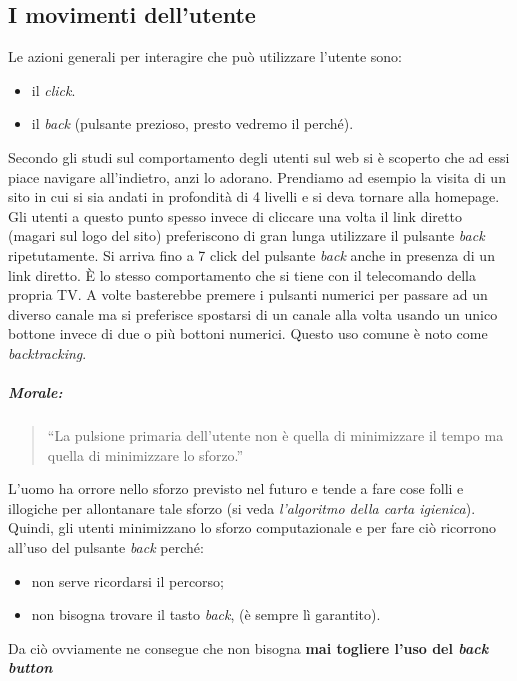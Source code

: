 		\subsection{I movimenti dell'utente}
			Le azioni generali per interagire che può utilizzare l'utente sono:
			\begin{itemize}
				\item il \emph{click}.
				\item il \emph{back} (pulsante prezioso, presto vedremo il perché).
			\end{itemize}
			Secondo gli studi sul comportamento degli utenti sul web si è scoperto che ad essi piace navigare all'indietro, anzi lo adorano. Prendiamo ad esempio la visita di un sito in cui si sia andati in profondità di 4 livelli e si deva tornare alla homepage. Gli utenti a questo punto spesso invece di cliccare una volta  il link diretto (magari sul logo del sito) preferiscono di gran lunga utilizzare il pulsante \emph{back} ripetutamente.
			Si arriva fino a 7 click del pulsante \emph{back} anche in presenza di un link diretto. È lo stesso comportamento che si tiene con il telecomando della propria TV. A volte basterebbe premere i pulsanti numerici per passare ad un diverso canale ma si preferisce spostarsi di un canale alla volta usando un unico bottone invece di due o più bottoni numerici. Questo uso comune è noto come \emph{backtracking}.
			\subparagraph*{Morale:}
			\begin{quote}
				``La pulsione primaria dell'utente non è quella di minimizzare il tempo ma quella di minimizzare lo sforzo.''
			\end{quote}
			L'uomo ha orrore nello sforzo previsto nel futuro e tende a fare cose folli e illogiche per allontanare tale sforzo (si veda \emph{l'algoritmo della carta igienica}). Quindi, gli utenti minimizzano lo sforzo computazionale e per fare ciò ricorrono all'uso del pulsante \emph{back} perché:
			\begin{itemize}
				\item non serve ricordarsi il percorso;
				\item non bisogna trovare il tasto \emph{back}, (è sempre lì garantito).
			\end{itemize}
			Da ciò ovviamente ne consegue che non bisogna \textbf{mai togliere l'uso del \emph{back button}}
			
